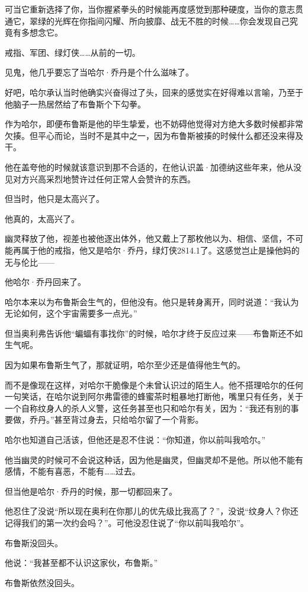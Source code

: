 \documentclass[../main]{subfiles}
\begin{document}
可当它重新选择了你，当你握紧拳头的时候能再度感觉到那种硬度，当你的意志贯通它，翠绿的光辉在你指间闪耀、所向披靡、战无不胜的时候……你会发现自己究竟有多想念它。

戒指、军团、绿灯侠……从前的一切。

见鬼，他几乎要忘了当哈尔·乔丹是个什么滋味了。

好吧，哈尔承认当时他确实兴奋得过了头，回来的感觉实在好得难以言喻，乃至于他脑子一热居然给了布鲁斯个下勾拳。

作为哈尔，即便布鲁斯是他的毕生挚爱，也不妨碍他觉得对方绝大多数时候都非常欠揍。但平心而论，当时不是其中之一，因为布鲁斯被揍的时候什么都还没来得及干。

他在盖夸他的时候就该意识到那不合适的，在他认识盖·加德纳这些年来，他从没见对方兴高采烈地赞许过任何正常人会赞许的东西。

但当时，他只是太高兴了。

他真的，太高兴了。

幽灵释放了他，视差也被他逐出体外，他又戴上了那枚他以为、相信、坚信，不可能再属于他的戒指，他又是哈尔·乔丹，绿灯侠2814.1了。这感觉岂止是操他妈的无与伦比——

他哈尔·乔丹回来了。

哈尔本来以为布鲁斯会生气的，但他没有。他只是转身离开，同时说道：“我认为无论如何，这个宇宙需要多一点光。”

但当奥利弗告诉他“蝙蝠有事找你”的时候，哈尔才终于反应过来——布鲁斯还不如生气呢。

因为如果布鲁斯生气了，那就证明，哈尔至少还是值得他生气的。

而不是像现在这样，对哈尔干脆像是个未曾认识过的陌生人。他不搭理哈尔的任何一句笑话，在哈尔说到阿尔弗雷德的蜂蜜茶时粗暴地打断他，嘴里只有任务，关于一个自称纹身人的杀人义警，这任务甚至也只和哈尔有关，因为：“我还有别的事要做，乔丹。”甚至背过身去，只给哈尔留了一个背影。

哈尔也知道自己活该，但他还是忍不住说：“你知道，你以前叫我哈尔。”

他当幽灵的时候可不会说这种话，因为他是幽灵，但幽灵却不是他。所以他不能有感情，不能有喜恶，不能有……过去。

但当他是哈尔·乔丹的时候，那一切都回来了。

他忍住了没说“所以现在奥利在你那儿的优先级比我高了？”，没说“纹身人？你还记得我们的第一次约会吗？”。可他没忍住说了“你以前叫我哈尔”。

布鲁斯没回头。

他说：“我甚至都不认识这家伙，布鲁斯。”

布鲁斯依然没回头。
\end{document}
